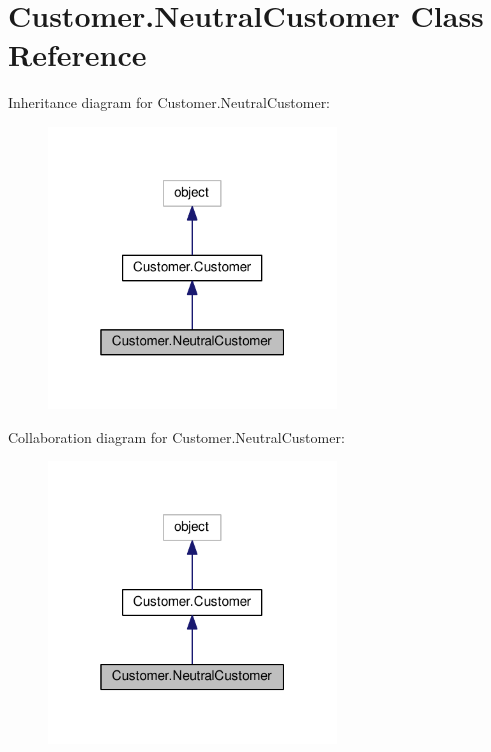 \hypertarget{class_customer_1_1_neutral_customer}{}\section{Customer.\+Neutral\+Customer Class Reference}
\label{class_customer_1_1_neutral_customer}


Inheritance diagram for Customer.\+Neutral\+Customer\+:\nopagebreak
\begin{figure}[H]
\begin{center}
\leavevmode
\includegraphics[width=217pt]{class_customer_1_1_neutral_customer__inherit__graph}
\end{center}
\end{figure}


Collaboration diagram for Customer.\+Neutral\+Customer\+:\nopagebreak
\begin{figure}[H]
\begin{center}
\leavevmode
\includegraphics[width=217pt]{class_customer_1_1_neutral_customer__coll__graph}
\end{center}
\end{figure}

